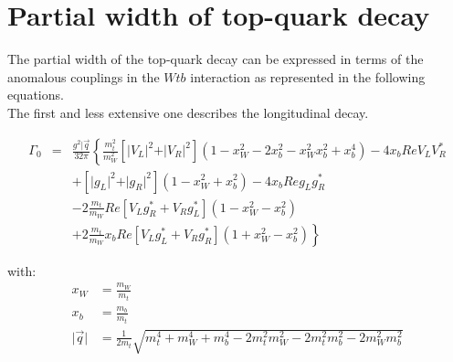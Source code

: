 

\section{Partial width of top-quark decay}

The partial width of the top-quark decay can be expressed in terms of the anomalous couplings in the $Wtb$ interaction as represented in the following equations.\\
The first and less extensive one describes the longitudinal decay.

\begin{eqnarray}
  \Gamma_{0} & = & \frac{g^{2} \vert \vec{q}}{32 \pi} \left\lbrace \frac{m_{t}^{2}}{m_{W}^{2}} \left[ \vert V_{L} \vert^{2} + \vert V_{R} \vert^{2} \right] (1 - x_{W}^{2} - 2x_{b}^{2} -x_{W}^{2} x_{b}^{2} + x_{b}^{4}) - 4x_{b}Re V_{L}V_{R}^{*} \right. \nonumber \\
             &   & + \left[ \vert g_{L} \vert^{2} + \vert g_{R} \vert^{2} \right] (1 - x_{W}^{2} + x_{b}^{2}) - 4 x_{b} Re g_{L} g_{R}^{*} \nonumber \\
             &   & - 2 \frac{m_{t}}{m_{W}} Re \left[ V_{L}g_{R}^{*} + V_{R}g_{L}^{*} \right] (1- x_{W}^{2} - x_{b}^{2}) \nonumber \\
             &   & \left. +2 \frac{m_t}{m_W} x_b Re \left[ V_{L}g_{L}^{*} + V_{R}g_{R}^{*} \right] (1+ x_{W}^{2} - x_{b}^{2}) \right\rbrace
\end{eqnarray}

with:
\begin{subequations} \label{eq::Simplified}
 \begin{align} 
  x_W & = \frac{m_{W}}{m_{t}} \\
  x_b & = \frac{m_{b}}{m_{t}} \\
  \vert \vec{q} \vert & = \frac{1}{2 m_{t}} \sqrt{m_{t}^{4} + m_{W}^{4} + m_{b}^{4} - 2m_{t}^{2} m_{W}^{2} - 2m_{t}^{2} m_{b}^{2} - 2m_{W}^{2}m_{b}^{2}}  
 \end{align}
\end{subequations}


